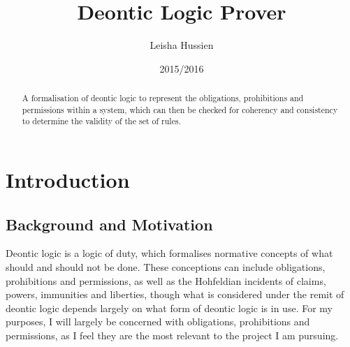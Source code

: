 \documentclass{l4proj}
\begin{document}
\title{Deontic Logic Prover}
\author{Leisha Hussien}
\date{2015/2016}
\maketitle

\begin{abstract}
A formalisation of deontic logic to represent the obligations, prohibitions and permissions within a system, which can then be checked for coherency and consistency to determine the validity of the set of rules.
\end{abstract}

\educationalconsent

\tableofcontents













\chapter{Introduction}

\section{Background and Motivation}%
Deontic logic is a logic of duty, which formalises normative concepts of what should and should not be done. These conceptions can include obligations, prohibitions and permissions, as well as the Hohfeldian incidents\cite{Hohfeld} of claims, powers, immunities and liberties, though what is considered under the remit of deontic logic depends largely on what form of deontic logic is in use. For my purposes, I will largely be concerned with obligations, prohibitions and permissions, as I feel they are the most relevant to the project I am pursuing.
\end{document}

